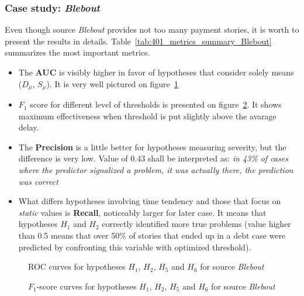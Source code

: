 \documentclass{article}
\begin{document}
\subsubsection{Case study: \textit{Blebout}}

Even though source \textit{Blebout} provides not too many payment stories, it is worth to present the results in details.
Table\ \ref{tab:401_metrics_summary_Blebout} summarizes the most important metrics.
\begin{itemize}
    \item The \textbf{AUC} is visibly higher in favor of hypotheses that consider solely means ($D_{\mu}$, $S_{\mu}$). It is very well pictured on figure\ \ref{fig:402_roc_curves_Blebout}
    \item $F_1$ score for different level of thresholds is presented on figure\ \ref{fig:403_f1_curves_Blebout}. It shows maximum effectiveness when threshold is put slightly above the avarage delay.
    \item The \textbf{Precision} is a little better for hypotheses measuring severity, but the difference is very low. Value of 0.43 shall be interpreted as: \textit{in 43\% of cases where the predictor signalized a problem, it was actually there, the prediction was correct}
    \item What differs hypotheses involving time tendency and those that focus on \textit{static} values is \textbf{Recall}, noticeably larger for later case. It means that hypotheses $H_1$ and $H_2$ correctly identified more true problems (value higher than 0.5 means that over 50\% of stories that ended up in a debt case were predicted by confronting this variable with optimized threshold).
\end{itemize}



\begin{figure}[htbp!]
    \begin{center}
        
    \caption{ROC curves for hypotheses $H_1$, $H_2$, $H_5$ and $H_6$ for source \textit{Blebout}}
    \label{fig:402_roc_curves_Blebout}
    \end{center}
\end{figure}

\begin{figure}[htbp!]
    \begin{center}
        
    \caption{$F_1$-score curves for hypotheses $H_1$, $H_2$, $H_5$ and $H_6$ for source \textit{Blebout}}
    \label{fig:403_f1_curves_Blebout}
    \end{center}
\end{figure}
\end{document}
